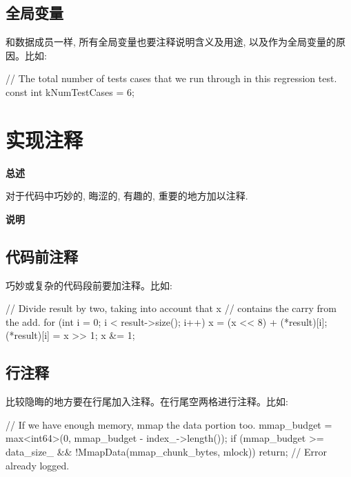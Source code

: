 \subsection{全局变量}

和数据成员一样, 所有全局变量也要注释说明含义及用途, 以及作为全局变量的原因。比如:

\begin{cppcode}
// The total number of tests cases that we run through in this regression test.
const int kNumTestCases = 6;
\end{cppcode}

\section{实现注释}

\textbf{总述}

对于代码中巧妙的, 晦涩的, 有趣的, 重要的地方加以注释.

\textbf{说明}

\subsection{代码前注释}

巧妙或复杂的代码段前要加注释。比如:

\begin{cppcode}
// Divide result by two, taking into account that x
// contains the carry from the add.
for (int i = 0; i < result->size(); i++) {
    x = (x << 8) + (*result)[i];
    (*result)[i] = x >> 1;
    x &= 1;
  }
\end{cppcode}

\subsection{行注释}

比较隐晦的地方要在行尾加入注释。在行尾空两格进行注释。比如:

\begin{cppcode}
// If we have enough memory, mmap the data portion too.
mmap_budget = max<int64>(0, mmap_budget - index_->length());
if (mmap_budget >= data_size_ && !MmapData(mmap_chunk_bytes, mlock))
return;  // Error already logged.
\end{cppcode}

